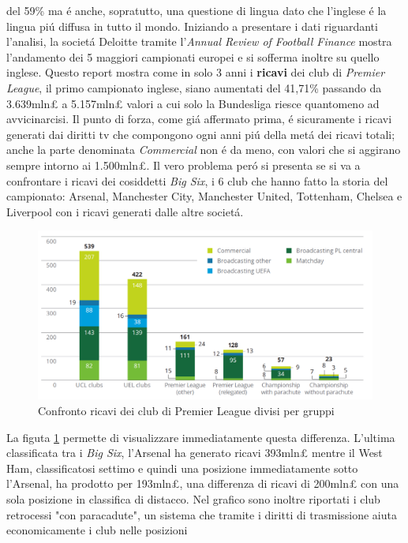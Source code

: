 \documentclass[
    corpo=12pt,
    oneside,
    evenboxes,
    tipotesi=triennale,
    stile=classica,
    oldstyle,
    autoretitolo,
    greek,
]{toptesi}
\begin{document}
\begin{interlinea}{1.5}
del 59\% ma \'e anche, sopratutto, una questione di lingua dato che l'inglese \'e la lingua pi\'u diffusa in tutto il mondo.\newline
Iniziando a presentare i dati riguardanti l'analisi, la societ\'a Deloitte tramite l'\emph{Annual Review of Football Finance} mostra
l'andamento dei 5 maggiori campionati europei e si sofferma inoltre su quello inglese. Questo report mostra come in solo 3 anni i \textbf{ricavi} 
dei club di \emph{Premier League}, il primo campionato inglese, siano aumentati del 41,71\% passando da 3.639mln£ a 5.157mln£ valori a cui solo
la Bundesliga riesce quantomeno ad avvicinarcisi. Il punto di forza, come gi\'a affermato prima, \'e sicuramente i ricavi generati dai diritti
tv che compongono ogni anni pi\'u della met\'a dei ricavi totali; anche la parte denominata \emph{Commercial} non \'e da meno, con valori
che si aggirano sempre intorno ai 1.500mln£. Il vero problema per\'o si presenta se si va a confrontare i ricavi dei cosiddetti \emph{Big Six}, 
i 6 club che hanno fatto la storia del campionato: Arsenal, Manchester City, Manchester United, Tottenham, Chelsea e Liverpool con i ricavi
generati dalle altre societ\'a.
\begin{figure}
    \centering
    \includegraphics[scale=0.5]{img/ricavi_premier.png}
    \caption{Confronto ricavi dei club di Premier League divisi per gruppi}
    \label{ricavi_premier}
\end{figure} 
La figuta \ref{ricavi_premier} permette di visualizzare immediatamente questa differenza. L'ultima classificata tra i \emph{Big Six},
l'Arsenal ha generato ricavi 393mln£ mentre il West Ham, classificatosi settimo e quindi una posizione immediatamente sotto l'Arsenal, ha 
prodotto per 193mln£, una differenza di ricavi di 200mln£ con una sola posizione in classifica di distacco. Nel grafico sono inoltre riportati
i club retrocessi "con paracadute", un sistema che tramite i diritti di trasmissione aiuta economicamente i club nelle posizioni

\end{interlinea}
\end{document}
